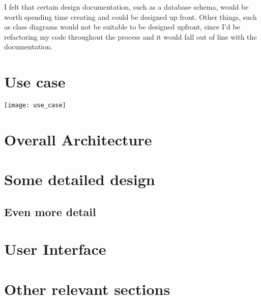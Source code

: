 I felt that certain design documentation, such as a database schema, would be worth spending time creating and could be designed up front. Other things, such as class diagrams would not be suitable to be designed upfront, since I'd be refactoring my code throughout the process and it would fall out of line with the documentation.

\section{Use case}

\texttt{[image: use\_case]}

\section{Overall Architecture}

\section{Some detailed design}

\subsection{Even more detail}

\section{User Interface}

\section{Other relevant sections}